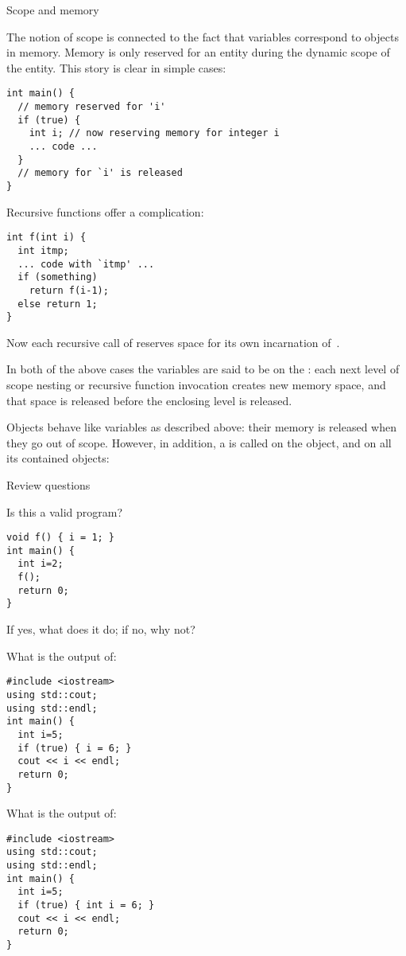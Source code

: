  {Scope and memory}

The notion of scope is connected to the fact that variables correspond
to objects in memory. Memory is only reserved for an entity during the
dynamic scope of the entity. This story is clear in simple cases:
\begin{verbatim}
int main() {
  // memory reserved for 'i'
  if (true) {
    int i; // now reserving memory for integer i
    ... code ...
  }
  // memory for `i' is released
}
\end{verbatim}
Recursive functions offer a complication:
\begin{verbatim}
int f(int i) {
  int itmp;
  ... code with `itmp' ...
  if (something)
    return f(i-1);
  else return 1;
}
\end{verbatim}
Now each recursive call of  reserves space for its own
incarnation of~.

In both of the above cases the variables are said to be on the
: each next level of scope nesting or recursive
function invocation creates new memory space, and that space is
released before the enclosing level is released.

Objects behave like variables as described above: their memory is
released when they go out of scope. However, in addition, a
 is called on the object, and on all its
contained objects:
%

 {Review questions}

\begin{exercise}
  \label{ex:cpp-scope1}
  Is this a valid program?
\begin{verbatim}
void f() { i = 1; }
int main() {
  int i=2;
  f();
  return 0;
}
\end{verbatim}
If yes, what does it do; if no, why not?
\end{exercise}

\begin{exercise}
  \label{ex:cpp-scope2}
  What is the output of:
\begin{verbatim}
#include <iostream>
using std::cout;
using std::endl;
int main() {
  int i=5;
  if (true) { i = 6; }
  cout << i << endl;
  return 0;
}
\end{verbatim}
\end{exercise}

\begin{exercise}
  \label{ex:cpp-scope3}
  What is the output of:
\begin{verbatim}
#include <iostream>
using std::cout;
using std::endl;
int main() {
  int i=5;
  if (true) { int i = 6; }
  cout << i << endl;
  return 0;
}
\end{verbatim}
\end{exercise}

